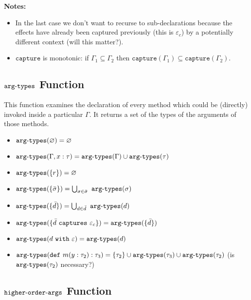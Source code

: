 \documentclass{llncs}
\newcommand{\keywadj}[1]{\mathtt{#1}}
\newcommand{\keyw}[1]{\keywadj{#1}~}
\newcommand{\kw}[1]{\keyw{ #1 }}
\newcommand{\kwa}[1]{\keywadj{ #1 }}
\newcommand{\hyphen}{\hbox{-}}
\begin{document}
\noindent \textbf{Notes:}
\begin{itemize}
	\item In the last case we don't want to recurse to sub-declarations because the effects have already been captured previously (this is $\varepsilon_c$) by a potentially different context (will this matter?).
	\item $\kwa{capture}$ is monotonic: if $\Gamma_1 \subseteq \Gamma_2$ then $\kwa{capture}(\Gamma_1) \subseteq \kwa{capture}(\Gamma_2)$.
\end{itemize}

\subsection{$\keywadj{arg \hyphen types}$ Function}

This function examines the declaration of every method which could be (directly) invoked inside a particular $\Gamma$. It returns a set of the types of the arguments of those methods.

\begin{itemize}
	\item $\kwa{arg \hyphen types}(\varnothing) = \varnothing$
	\item $\kwa{arg \hyphen types}(\Gamma, x : \tau) = \kwa{arg \hyphen types}(\Gamma) \cup \kwa{arg \hyphen types}(\tau)$
	\item $\kwa{arg \hyphen types}(\{r\}) = \varnothing$
	\item $\kwa{arg \hyphen types}(\{\bar \sigma\}) = \bigcup_{\sigma \in \bar \sigma}~\kwa{arg \hyphen types}(\sigma)$
	\item $\kwa{arg \hyphen types}(\{\bar d\}) = \bigcup_{d \in \bar d}~\kwa{arg \hyphen types}(d)$
	\item $\kwa{arg \hyphen types}(\{\bar d ~\keyw{captures} \varepsilon_c\}) =
 \kwa{arg \hyphen types}(\{ \bar d \})$
 	\item $\kwa{arg \hyphen types}(d ~\kw{with} \varepsilon) = \kwa{arg \hyphen types}(d)$
 	\item $\kwa{arg \hyphen types}(\kw{def} m(y: \tau_2): \tau_3) = \{ \tau_2 \} \cup \kwa{arg \hyphen types}(\tau_3) \cup \kwa{arg \hyphen types}(\tau_2)$ (is $\kwa{arg \hyphen types}(\tau_2)$ necessary?)
\end{itemize}

\subsection{$\keywadj{higher \hyphen order \hyphen args}$ Function}
\end{document}

